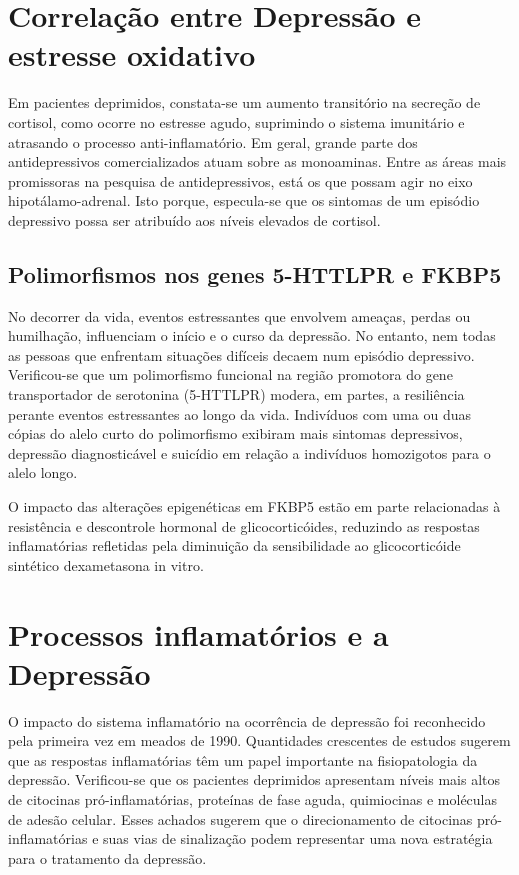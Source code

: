 \section{Correlação entre Depressão e estresse oxidativo}

Em pacientes deprimidos, constata-se um aumento transitório na secreção de cortisol, como ocorre no estresse agudo, suprimindo o sistema imunitário e atrasando o processo anti-inflamatório. \cite{Kandel} Em geral, grande parte dos antidepressivos comercializados atuam sobre as monoaminas. Entre as áreas mais promissoras na pesquisa de antidepressivos, está os que possam agir no eixo hipotálamo-adrenal. Isto porque, especula-se que os sintomas de um episódio depressivo possa ser atribuído aos níveis elevados de cortisol. \cite{Schatzberg2015}

\subsection{Polimorfismos nos genes 5-HTTLPR e FKBP5}

  No decorrer da vida, eventos estressantes que envolvem ameaças, perdas ou humilhação, influenciam o início e o curso da depressão. No entanto, nem todas as pessoas que enfrentam situações difíceis decaem num episódio depressivo. Verificou-se que um polimorfismo funcional na região promotora do gene transportador de serotonina (5-HTTLPR) modera, em partes, a resiliência perante eventos estressantes ao longo da vida. Indivíduos com uma ou duas cópias do alelo curto do polimorfismo exibiram mais sintomas depressivos, depressão diagnosticável e suicídio em relação a indivíduos homozigotos para o alelo longo. \cite{Caspi2003}
  
  O impacto das alterações epigenéticas em FKBP5 estão em parte relacionadas à resistência e descontrole hormonal de glicocorticóides, reduzindo as respostas inflamatórias refletidas pela diminuição da sensibilidade
  ao glicocorticóide sintético dexametasona in vitro. \cite{Klengel2013}
  
\section{Processos inflamatórios e a Depressão}

O impacto do sistema inflamatório na ocorrência de depressão foi reconhecido pela primeira vez em meados de 1990. \cite{Yang2012} Quantidades crescentes de estudos sugerem que as respostas inflamatórias têm um papel importante na fisiopatologia da depressão. Verificou-se que os pacientes deprimidos apresentam níveis mais altos de citocinas pró-inflamatórias, proteínas de fase aguda, quimiocinas e moléculas de adesão celular. \cite{Raison2006} Esses achados sugerem que o direcionamento de citocinas pró-inflamatórias e suas vias de sinalização podem representar uma nova estratégia para o tratamento da depressão.

